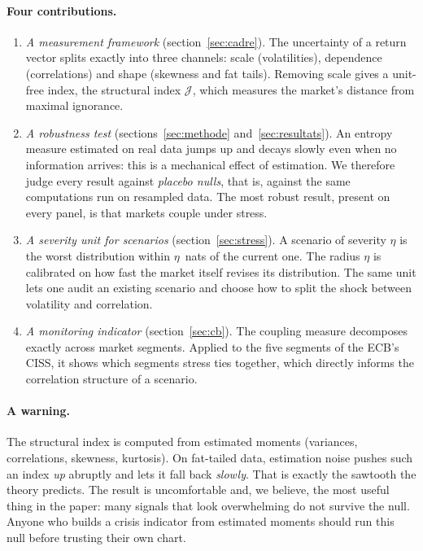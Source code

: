 \documentclass[11pt]{article}
\theoremstyle{definition}
\newcommand{\JJ}{\mathcal{J}}
\begin{document}
\paragraph{Four contributions.}
\begin{enumerate}
\item \emph{A measurement framework} (section~\ref{sec:cadre}). The
uncertainty of a return vector splits exactly into three channels: scale
(volatilities), dependence (correlations) and shape (skewness and fat tails).
Removing scale gives a unit-free index, the structural index $\JJ$, which
measures the market's distance from maximal ignorance.
\item \emph{A robustness test} (sections~\ref{sec:methode}
and~\ref{sec:resultats}). An entropy measure estimated on real data jumps up
and decays slowly even when no information arrives: this is a mechanical
effect of estimation. We therefore judge every result against \emph{placebo
nulls}, that is, against the same computations run on resampled data. The most
robust result, present on every panel, is that markets couple under stress.
\item \emph{A severity unit for scenarios} (section~\ref{sec:stress}). A
scenario of severity $\eta$ is the worst distribution within $\eta$~nats of
the current one. The radius $\eta$ is calibrated on how fast the market itself
revises its distribution. The same unit lets one audit an existing scenario
and choose how to split the shock between volatility and correlation.
\item \emph{A monitoring indicator} (section~\ref{sec:cb}). The coupling
measure decomposes exactly across market segments. Applied to the five
segments of the ECB's CISS, it shows which segments stress ties together,
which directly informs the correlation structure of a scenario.
\end{enumerate}

\paragraph{A warning.} The structural index is computed from estimated
moments (variances, correlations, skewness, kurtosis). On fat-tailed data,
estimation noise pushes such an index \emph{up} abruptly and lets it fall back
\emph{slowly}. That is exactly the sawtooth the theory predicts. The result is
uncomfortable and, we believe, the most useful thing in the paper: many
signals that look overwhelming do not survive the null. Anyone who builds a
crisis indicator from estimated moments should run this null before trusting
their own chart.
\end{document}
